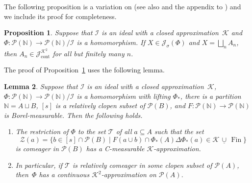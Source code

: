 \documentclass{amsart}
\makeatletter
\def\Fin{{\rm Fin}}   %
\newtheorem{proposition}{Proposition}[section]
\newtheorem{lemma}[proposition]{Lemma}
\theoremstyle{definition}
\theoremstyle{remark}
\newcommand{\ucup}{\,\underline{\cup}\,}
\def\Fin{\operatorname{Fin}}
\DeclareMathOperator{\Ccont}{cont}
\newcommand{\Jcont}{\cJ_{\Ccont}}
\newcommand{\Jsigma}{\cJ_\sigma}
\newcommand{\cK}{{\mathcal K}}
\renewcommand{\proofname}{Proof}
\renewenvironment{proof}[1][\proofname]{\par
\let\oldqedsymbol\qedsymbol             %
  \normalfont
  \topsep6\p@\@plus6\p@ \trivlist
  \item[\hskip\labelsep\hskip\parindent\scshape
    #1\@addpunct{.}]\ignorespaces
}{%
  \qed\endtrivlist
\global\let\qedsymbol\oldqedsymbol      %
}
\newcommand{\cP}{\mathcal P}
\newcommand{\bbN}{\mathbb N}
\newcommand{\cI}{{\mathcal I}} %
\newcommand{\cJ}{{\mathcal J}} %
\newcommand{\cT}{\mathcal T}
\newcommand{\cX}{\mathcal X}
\newcommand{\cZ}{\mathcal Z}
\newcommand{\calH}{\mathcal H}
\newcommand{\cPN}{\cP(\bbN)}
\numberwithin{claim}{subsection}
\makeatother
\begin{document}
%

The following proposition is a variation on \cite[Lemma 3.12.3]{Fa:AQ} (see also \cite[Lemma~3C]{Fr:Farah} and the appendix to \cite{de2023trivial}) and we include its proof for completeness.   


\begin{proposition}
	\label{P+.Jsigma-to-Jcont}	\label{P.Jsigma-to-Jcont}
	Suppose that $\cI$ is an ideal with a closed approximation~$\cK$ and  $\Phi\colon \cP(\bbN)\to \cP(\bbN)/\cI$ is a homomorphism. If $X\in \Jsigma(\Phi)$ and $X=\bigsqcup_n A_n$,   then $A_n\in \Jcont^{\cK^2}$  for all but finitely many $n$. 
\end{proposition}

The proof of Proposition~\ref{P+.Jsigma-to-Jcont} uses the following lemma. 

\begin{lemma}\label{L+.Jsigma-to-Jcont}
	Suppose that $\cI$ is an ideal with a closed approximation~$\cK$, 	$\Phi\colon \cP(\bbN)\to \cP(\bbN)/\cI$ is a homomorphism with lifting $\Phi_*$, there is a partition $\bbN=A\sqcup B$, $[s]$ is a relatively clopen subset of $\cP(B)$,  and $F\colon \cP(\bbN)\to \cP(\bbN)$ is Borel-measurable.  Then the following holds. 
	\begin{enumerate}
		\item \label{L.Jsigma-to-Jcont.1}	The restriction of $\Phi$  to  the set $\cT$ of all $a\subseteq A$ such that the set 
		\[
		\cZ(a)=\{b\in [s]\cap \cP(B)\mid F(a\cup b)\cap \Phi_*(A)\Delta \Phi_*(a)\in \cK\ucup \Fin\}
		\]
		is comeager in $\cP(B)$ has a C-measurable $\cK$-approximation.
		
		\item  \label{L.Jsigma-to-Jcont.2} In particular, if $\cT$ is relatively comeager in some clopen subset of $\cP(A)$, then~$\Phi$ has a continuous $\cK^2$-approximation on $\cP(A)$. 
	\end{enumerate}	
\end{lemma}
\end{document}

